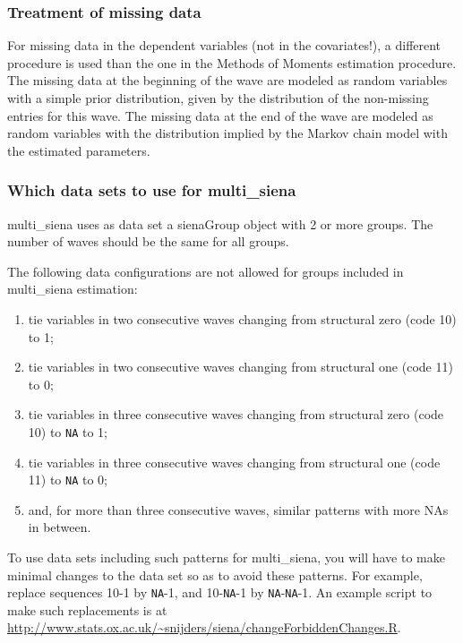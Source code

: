 \documentclass[a4paper,fleqn,11pt]{article}
\newcommand{\+}{\, + \,}
\newcommand{\sfn}[1]{\textsf{#1}}
\begin{document}
\subsubsection{Treatment of missing data}

For missing data in the dependent variables (not in the covariates!),
a different procedure is used than the one in the Methods of Moments
estimation procedure.
The missing data at the beginning of the wave are modeled as random
variables with a simple prior distribution, given by the
distribution of the non-missing entries for this wave.
The missing data at the end of the wave are modeled
as random variables with the distribution implied
by the Markov chain model with the estimated parameters.


\subsubsection{Which data sets to use for multi\_siena}
\label{S_sBData}

\textsf{multi\_siena} uses as data set a \sfn{sienaGroup} object with 2 or more groups.
The number of waves should be the same for all groups.

The following data configurations are not allowed for groups
included in \textsf{multi\_siena} estimation:
\begin{enumerate}
\item tie variables in two consecutive waves changing from
    structural zero (code 10) to 1;
\item tie variables in two consecutive waves changing from
    structural one (code 11) to 0;
\item tie variables in three consecutive waves changing from
    structural zero (code 10) to \texttt{NA} to 1;
\item tie variables in three consecutive waves changing from
    structural one (code 11) to \texttt{NA} to 0;
\item and, for more than three consecutive waves, similar patterns
    with more NAs in between.
\end{enumerate}
To use data sets including such patterns for \textsf{multi\_siena},
you will have to make minimal changes to the data set
so as to avoid these patterns.
For example, replace sequences 10-1 by \texttt{NA}-1,
and 10-\texttt{NA}-1 by \texttt{NA}-\texttt{NA}-1.
An example script to make such replacements is at
{\small{\url{http://www.stats.ox.ac.uk/~snijders/siena/changeForbiddenChanges.R}}}.
\end{document}
